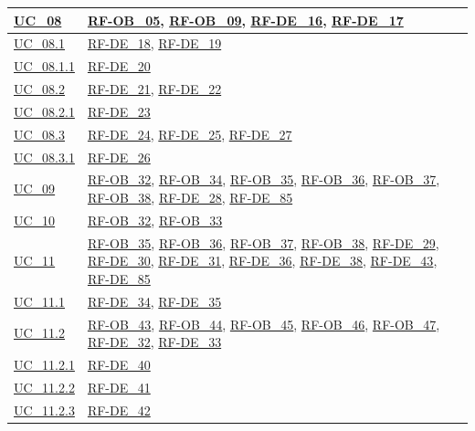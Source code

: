 \begin{longtable}{|
        >{\raggedright\arraybackslash}p{} |
        >{\raggedright\arraybackslash}p{} |
    }
    \hyperref[uc_08]{UC\_08} & \hyperlink{rf-ob_5}{RF-OB\_05}, \hyperlink{rf-ob_9}{RF-OB\_09}, \hyperlink{rf-de_16}{RF-DE\_16}, \hyperlink{rf-de_17}{RF-DE\_17} \\
    \hline
    \hyperref[uc_08.1]{UC\_08.1} & \hyperlink{rf-de_18}{RF-DE\_18}, \hyperlink{rf-de_19}{RF-DE\_19} \\
    \hline
    \hyperref[uc_08.1.1]{UC\_08.1.1} & \hyperlink{rf-de_20}{RF-DE\_20} \\
    \hline
    \hyperref[uc_08.2]{UC\_08.2} & \hyperlink{rf-de_21}{RF-DE\_21}, \hyperlink{rf-de_22}{RF-DE\_22} \\
    \hline
    \hyperref[uc_08.2.1]{UC\_08.2.1} & \hyperlink{rf-de_23}{RF-DE\_23} \\
    \hline
    \hyperref[uc_08.3]{UC\_08.3} & \hyperlink{rf-de_24}{RF-DE\_24}, \hyperlink{rf-de_25}{RF-DE\_25}, \hyperlink{rf-de_27}{RF-DE\_27} \\
    \hline
    \hyperref[uc_08.3.1]{UC\_08.3.1} & \hyperlink{rf-de_26}{RF-DE\_26} \\
    \hline

    \hyperref[uc_09]{UC\_09} & \hyperlink{rf-ob_32}{RF-OB\_32}, \hyperlink{rf-ob_34}{RF-OB\_34}, \hyperlink{rf-ob_35}{RF-OB\_35}, \hyperlink{rf-ob_36}{RF-OB\_36}, \hyperlink{rf-ob_37}{RF-OB\_37}, \hyperlink{rf-ob_38}{RF-OB\_38}, \hyperlink{rf-de_28}{RF-DE\_28}, \hyperlink{rf-de_85}{RF-DE\_85} \\
    \hline
    \hyperref[uc_10]{UC\_10} & \hyperlink{rf-ob_32}{RF-OB\_32}, \hyperlink{rf-ob_33}{RF-OB\_33} \\
    \hline

    \hyperref[uc_11]{UC\_11} & \hyperlink{rf-ob_35}{RF-OB\_35}, \hyperlink{rf-ob_36}{RF-OB\_36}, \hyperlink{rf-ob_37}{RF-OB\_37}, \hyperlink{rf-ob_38}{RF-OB\_38}, \hyperlink{rf-de_29}{RF-DE\_29}, \hyperlink{rf-de_30}{RF-DE\_30}, \hyperlink{rf-de_31}{RF-DE\_31}, \hyperlink{rf-de_36}{RF-DE\_36}, \hyperlink{rf-de_38}{RF-DE\_38}, \hyperlink{rf-de_43}{RF-DE\_43}, \hyperlink{rf-de_85}{RF-DE\_85} \\
    \hline
    \hyperref[uc_11.1]{UC\_11.1} & \hyperlink{rf-de_34}{RF-DE\_34}, \hyperlink{rf-de_35}{RF-DE\_35} \\
    \hline
    \hyperref[uc_11.2]{UC\_11.2} & \hyperlink{rf-ob_43}{RF-OB\_43}, \hyperlink{rf-ob_44}{RF-OB\_44}, \hyperlink{rf-ob_45}{RF-OB\_45}, \hyperlink{rf-ob_46}{RF-OB\_46}, \hyperlink{rf-ob_47}{RF-OB\_47}, \hyperlink{rf-de_32}{RF-DE\_32}, \hyperlink{rf-de_33}{RF-DE\_33} \\
    \hline
    \hyperref[uc_11.2.1]{UC\_11.2.1} & \hyperlink{rf-de_40}{RF-DE\_40} \\
    \hline
    \hyperref[uc_11.2.2]{UC\_11.2.2} & \hyperlink{rf-de_41}{RF-DE\_41} \\
    \hline
    \hyperref[uc_11.2.3]{UC\_11.2.3} & \hyperlink{rf-de_42}{RF-DE\_42} \\
    \hline


\end{longtable}
